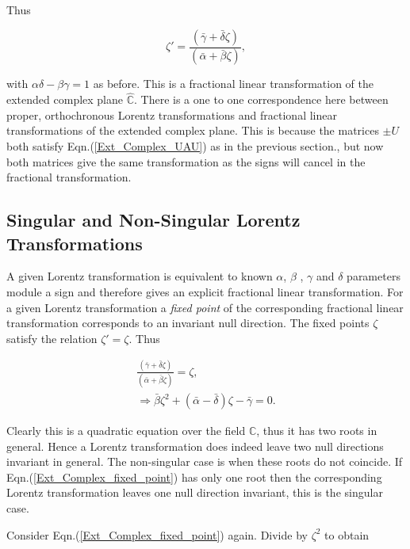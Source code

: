 \noindent Thus 

\begin{equation}\label{Extended_Complex_Fractional_Linear_Transformation}
\zeta' = \frac{(\bar{\gamma} + \bar{\delta}\zeta)}{(\bar{\alpha} + \bar{\beta}\zeta)},
\end{equation}

\noindent with $\alpha\delta - \beta\gamma = 1$ as before. This is a fractional linear transformation of the extended complex plane $\hat{\mathbb{C}}$. There is a one to one correspondence here between proper, orthochronous Lorentz transformations and fractional linear transformations of the extended complex plane. This is because the matrices $\pm U$ both satisfy Eqn.(\ref{Ext_Complex_UAU}) as in the previous section., but now both matrices give the same transformation as the signs will cancel in the fractional transformation.

\subsection{Singular and Non-Singular Lorentz Transformations}

A given Lorentz transformation is equivalent to known $\alpha$, $\beta$ , $\gamma$ and $\delta$ parameters module a sign and therefore gives an explicit fractional linear transformation. For a given Lorentz transformation a \textit{fixed point} of the corresponding fractional linear transformation corresponds to an invariant null direction. The fixed points $\zeta$ satisfy the relation $\zeta' = \zeta$. Thus

\begin{eqnarray}\nonumber
\frac{(\bar{\gamma} + \bar{\delta}\zeta)}{(\bar{\alpha} + \bar{\beta}\zeta)} = \zeta, \\\label{Ext_Complex_fixed_point}
\Rightarrow \bar{\beta}\zeta^2 + (\bar{\alpha}- \bar{\delta})\zeta - \bar{\gamma} = 0. 
\end{eqnarray}

\noindent Clearly this is a quadratic equation over the field $\mathbb{C}$, thus it has two roots in general. Hence a Lorentz transformation does indeed leave two null directions invariant in general. The non-singular case is when these roots do not coincide. If Eqn.(\ref{Ext_Complex_fixed_point}) has only one root then the corresponding Lorentz transformation leaves one null direction invariant, this is the singular case.

Consider Eqn.(\ref{Ext_Complex_fixed_point}) again. Divide by $\zeta^2$ to obtain

